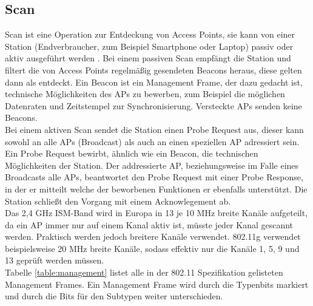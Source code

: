 \subsection{Scan}
\label{ch:phase1:sec:scan}
Scan ist eine Operation zur Entdeckung von Access Points, sie kann von einer Station (Endverbraucher, zum Beispiel Smartphone oder Laptop) passiv oder aktiv ausgeführt werden \cite{ieee2012scan}.
Bei einem passiven Scan empfängt die Station und filtert die von Access Points regelmäßig gesendeten Beacons heraus, diese gelten dann als entdeckt.
Ein Beacon ist ein Management Frame, der dazu gedacht ist, technische Möglichkeiten des APs zu bewerben, zum Beispiel die möglichen Datenraten und Zeitstempel zur Synchronisierung.
Versteckte APs senden keine Beacons. \\
Bei einem aktiven Scan sendet die Station einen Probe Request aus, dieser kann sowohl an alle APs (Broadcast) als auch an einen speziellen AP adressiert sein.
Ein Probe Request bewirbt, ähnlich wie ein Beacon, die technischen Möglichkeiten der Station.
Der addressierte AP, beziehungsweise im Falle eines Broadcasts alle APs, beantwortet den Probe Request mit einer Probe Response, in der er mitteilt welche der beworbenen Funktionen er ebenfalls unterstützt. 
Die Station schließt den Vorgang mit einem Acknowlegement ab. \\
Das 2,4 GHz ISM-Band wird in Europa in 13 je 10 MHz breite Kanäle aufgeteilt, da ein AP immer nur auf einem Kanal aktiv ist, müsste jeder Kanal gescannt werden.
Praktisch werden jedoch breitere Kanäle verwendet. 
802.11g verwendet beispielsweise 20 MHz breite Kanäle, sodass effektiv nur die Kanäle 1, 5, 9 und 13 geprüft werden müssen. \\
Tabelle \ref{table:management} listet alle in der 802.11 Spezifikation gelisteten Management Frames.
Ein Management Frame wird durch die Typenbits markiert und durch die Bits für den Subtypen weiter unterschieden.

